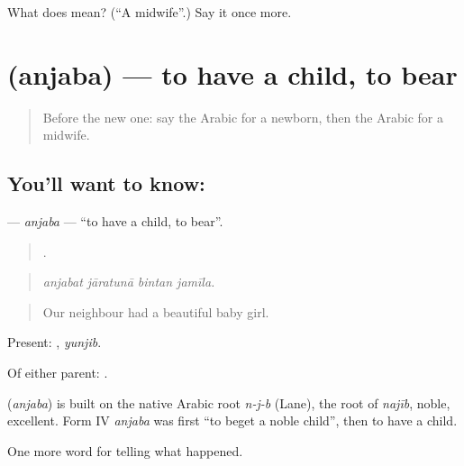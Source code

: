\begin{tcolorbox}[breakable,colback=teal!4,colframe=teal!35!black,title={Before you move on}]
What does  mean? (\textquotedblleft{}A midwife\textquotedblright{}.) Say it once more.
\end{tcolorbox}
\section[\texorpdfstring{\ar{أنجب} (anjaba)}{أنجب (anjaba)}]{ (anjaba) — to have a child, to bear}

\label{lesson:AR-C311-anjaba}



\begin{quote}
Before the new one: say the Arabic for a newborn, then the Arabic for a midwife.
\end{quote}

\subsection*{You'll want to know: }
\textbf{} — \emph{anjaba} — \textquotedblleft{}to have a child, to bear\textquotedblright{}.

\begin{quote}
   .
\end{quote}

\begin{quote}
\emph{anjabat jāratunā bintan jamīla.}
\end{quote}

\begin{quote}
Our neighbour had a beautiful baby girl.
\end{quote}

Present: , \emph{yunjib}.

Of either parent:    .

\begin{cousinweb}
\textbf{} (\emph{anjaba}) is built on the native Arabic root \emph{n-j-b} (Lane), the root of \emph{najīb}, noble, excellent. Form IV \emph{anjaba} was first \textquotedblleft{}to beget a noble child\textquotedblright{}, then to have a child.
\end{cousinweb}

\begin{grammarlens}[title={What you've built}]
One more word for telling what happened.
\end{grammarlens}

